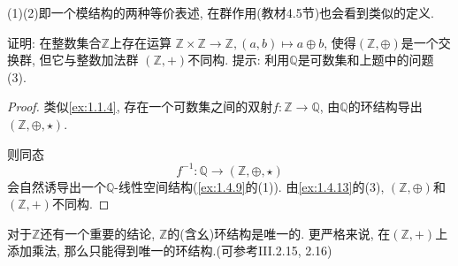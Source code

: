 \begin{remark}
    (1)(2)即一个模结构的两种等价表述, 在群作用(教材4.5节)也会看到类似的定义.
\end{remark}

\begin{problem}
    证明: 在整数集合$\mathbb{Z}$上存在运算
$\mathbb{Z} \times \mathbb{Z} \to \mathbb{Z}, (a,b) \mapsto a \oplus b$,
使得$(\mathbb{Z}, \oplus)$是一个交换群, 但它与整数加法群
$(\mathbb{Z}, +)$不同构. 提示: 利用$\mathbb{Q}$是可数集和上题中的问题(3).
\end{problem}

\begin{proof}
    类似\ref{ex:1.1.4}, 存在一个可数集之间的双射$f: \mathbb{Z} \to \mathbb{Q}$, 由$\mathbb{Q}$的环结构导出$(\mathbb{Z}, \oplus, \star)$.
    
    则同态
    \[
        f^{-1}: \mathbb{Q} \to (\mathbb{Z}, \oplus, \star)
    \]
    会自然诱导出一个$\mathbb{Q}$-线性空间结构(\ref{ex:1.4.9}的(1)). 由\ref{ex:1.4.13}的(3),
    $(\mathbb{Z}, \oplus)$和$(\mathbb{Z}, +)$不同构.
\end{proof}

\begin{remark}
    对于$\mathbb{Z}$还有一个重要的结论, $\mathbb{Z}$的(含幺)环结构是唯一的. 更严格来说, 在$(\mathbb{Z}, +)$上添加乘法, 那么只能得到唯一的环结构.(可参考\cite{aluffi2009algebra}III.2.15, 2.16)
\end{remark}